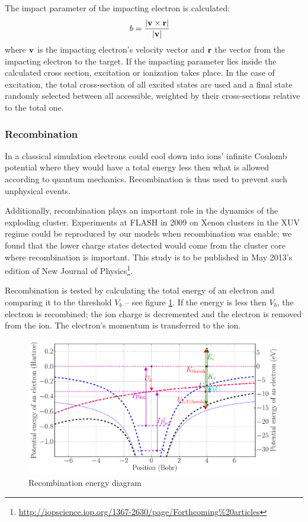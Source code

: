The impact parameter of the impacting electron is calculated:
\begin{align}
b & = \frac{\left| \textbf{v} \times \textbf{r} \right|}{\left| \textbf{v} \right|}
\label{eqn:ionization:impact:parameter}
\end{align}
where $\textbf{v}$ is the impacting electron's velocity vector and $\textbf{r}$ the vector
from the impacting electron to the target. If the impacting parameter lies
inside the calculated cross section, excitation or ionization takes place. In
the case of excitation, the total cross-section of all excited states are used
and a final state randomly selected between all accessible, weighted by their
cross-sections relative to the total one.



\subsubsection{Recombination}
In a classical simulation electrons could cool down into ions' infinite Coulomb
potential where they would have a total energy less then what is allowed
according to quantum mechanics. Recombination is thus used to prevent such
unphysical events.

Additionally, recombination plays an important role in the dynamics of the
exploding cluster. Experiments at FLASH in 2009 on Xenon clusters in the XUV
regime\cite{Thomas2009} could be reproduced by our models when recombination
was enable; we found that the lower charge states detected would come from the
cluster core where recombination is important. This study is to be published in
May 2013's edition of New Journal of
Physics\footnote{\url{http://iopscience.iop.org/1367-2630/page/Forthcoming\%20articles}}.

Recombination is tested by calculating the total energy of an electron and
comparing it to the threshold $V_b$ -- see figure \ref{fig:recombination}. If
the energy is less then $V_b$, the electron is recombined; the ion charge is
decremented and the electron is removed from the ion. The electron's momentum
is transferred to the ion.

\begin{figure}
    \begin{center}
    \includegraphics[width=0.98\columnwidth]{figures/potential_landscape}
    \end{center}
    \caption{\label{fig:recombination}Recombination energy diagram}
\end{figure}
